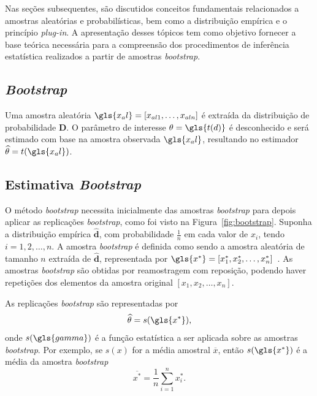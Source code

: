 Nas seções subsequentes, são discutidos conceitos fundamentais relacionados a amostras aleatórias e probabilísticas, bem como a distribuição empírica e o princípio \textit{plug-in}. A apresentação desses tópicos tem como objetivo fornecer a base teórica necessária para a compreensão dos procedimentos de inferência estatística realizados a partir de amostras \textit{bootstrap}.

\subsection{\textit{Bootstrap}}
\label{sec:boot}
Uma amostra aleatória $\gls{x_al} = [x_{al1},\ldots, x_{aln}]$ é extraída da distribuição de probabilidade \textbf{D}. O parâmetro de interesse $\theta = \gls{t(d)}$ é desconhecido e será estimado com base na amostra observada $\gls{x_al}$, resultando no estimador $\widehat{\theta} = t(\gls{x_al})$.

\subsection{Estimativa \textit{Bootstrap}}
\label{sec:estboot}
O método \textit{bootstrap} necessita inicialmente das amostras \textit{bootstrap} para depois aplicar as replicações \textit{bootstrap}, como foi visto na Figura~\ref{fig:bootstrap}. Suponha a distribuição empírica $\widehat{\textbf{d}}$, com probabilidade $\frac{1}{n}$ em cada valor de $x_i$, tendo $i = 1, 2,\ldots, n$. A amostra \textit{bootstrap} é definida como sendo a amostra aleatória de tamanho $n$ extraída de $\widehat{\textbf{d}}$, representada por $\gls{x^*} =[x_1^*, x_2^*,\ldots, x_n^*]$~\cite{EFRON:1994}. As amostras \textit{bootstrap} são obtidas por reamostragem com reposição, podendo haver repetições dos elementos da amostra original $[x_1, x_2,\ldots, x_n]$.

As replicações \textit{bootstrap} são representadas por
\begin{equation}
    \widehat{\theta} = s(\gls{x^*}),
\end{equation}
onde $s(\gls{gamma})$ é a função estatística a ser aplicada sobre as amostras \textit{bootstrap}. Por exemplo, se $s(x)$ for a média amostral $\overline{x}$, então $s(\gls{x^*})$ é a média da amostra \textit{bootstrap}
\begin{equation}
    \overline{x^*} = \frac{1}{n} \sum_{i=1}^{n} x_i^*.
\end{equation}

